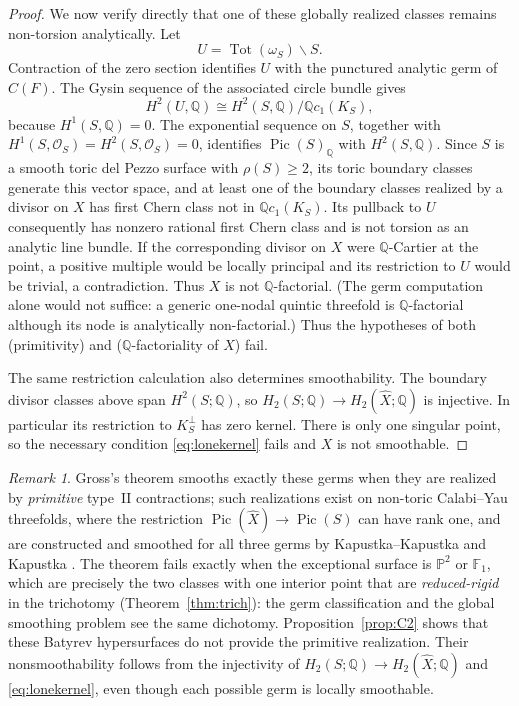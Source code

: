 \documentclass[11pt]{amsart}
\theoremstyle{definition}
\theoremstyle{remark}
\newtheorem{remark}[theorem]{Remark}
\newcommand{\PP}{\mathbb{P}}
\newcommand{\FF}{\mathbb{F}}
\begin{document}
\begin{proof}
We now verify directly that one of these globally realized classes remains
non-torsion analytically.  Let
\[
 U=\operatorname{Tot}(\omega_S)\smallsetminus S.
\]
Contraction of the zero section identifies $U$ with the punctured analytic
germ of $C(F)$.  The Gysin sequence of the associated circle bundle gives
\[
 H^2(U,\mathbb{Q})\cong
 H^2(S,\mathbb{Q})/\mathbb{Q} c_1(K_S),
\]
because $H^1(S,\mathbb{Q})=0$.  The exponential sequence on $S$, together
with $H^1(S,\mathcal O_S)=H^2(S,\mathcal O_S)=0$, identifies
$\operatorname{Pic}(S)_{\mathbb{Q}}$ with $H^2(S,\mathbb{Q})$.  Since $S$ is
a smooth toric del Pezzo surface with $\rho(S)\ge2$, its toric boundary
classes generate this vector space, and at least one of the boundary classes
realized by a divisor on $X$ has first Chern class not in
$\mathbb{Q}c_1(K_S)$.  Its pullback to $U$ consequently has nonzero rational
first Chern class and is not torsion as an analytic line bundle.  If the
corresponding divisor on $X$ were $\mathbb Q$-Cartier at the point, a positive
multiple would be locally principal and its restriction to $U$ would be
trivial, a contradiction.  Thus $X$ is not
$\mathbb{Q}$-factorial.  (The germ computation alone would not suffice:
a generic one-nodal quintic threefold is $\mathbb{Q}$-factorial although
its node is analytically non-factorial.)  Thus
the hypotheses of both \cite[Thm.~5.8]{Gross97} (primitivity) and
\cite[Thm.~4.3]{Gross97} ($\mathbb{Q}$-factoriality of $X$) fail.

The same restriction calculation also determines smoothability.
The boundary divisor classes above span $H^2(S;\mathbb Q)$, so
$H_2(S;\mathbb Q)\to H_2(\widehat X;\mathbb Q)$ is injective.
In particular its restriction to $K_S^\perp$ has zero kernel.
There is only one singular point, so the necessary condition
\eqref{eq:lonekernel} fails and $X$ is not smoothable.
\end{proof}

\begin{remark}\label{rem:germalign}
Gross's theorem \cite[Thm.~5.8]{Gross97} smooths exactly these germs
when they are realized by \emph{primitive} type~II contractions; such
realizations exist on non-toric Calabi--Yau threefolds, where the
restriction $\operatorname{Pic}(\widehat X) \to \operatorname{Pic}(S)$
can have rank one, and are constructed and smoothed for all three germs
by Kapustka--Kapustka and Kapustka
\cite{KapustkaKapustka09,Kapustka09}.  The theorem fails exactly when the
exceptional surface is $\PP^2$ or $\FF_1$, which are precisely the two
classes with one interior point that
are \emph{reduced-rigid} in the trichotomy (Theorem~\ref{thm:trich}): the germ
classification and the global smoothing problem see the same dichotomy.
Proposition~\ref{prop:C2} shows that these Batyrev hypersurfaces do
not provide the primitive realization.  Their nonsmoothability follows
from the injectivity of $H_2(S;\mathbb Q)\to
H_2(\widehat X;\mathbb Q)$ and \eqref{eq:lonekernel}, even though
each possible germ is locally smoothable.
\end{remark}
\end{document}
